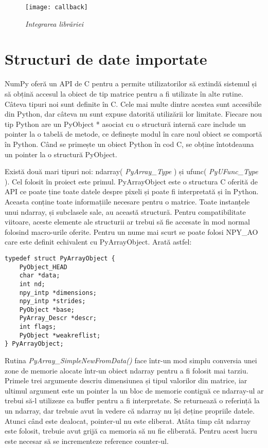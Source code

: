 \begin{figure}
    \centering
    \texttt{[image: callback]}
    \caption{\textit{Integrarea librăriei}}
    \label{cbs}
\end{figure}



\section{Structuri de date importate}

NumPy oferă un API de C pentru a permite utilizatorilor să extindă sistemul și să obțină accesul la obiect de tip matrice pentru a fi utilizate în alte rutine. 
Câteva tipuri noi sunt definite în C. Cele mai multe dintre acestea sunt accesibile din Python, dar câteva nu sunt expuse datorită utilizării lor limitate. Fiecare nou tip Python are un PyObject * asociat cu o structură internă care include un pointer la o tabelă de metode, ce definește modul în care noul obiect se comportă în Python. Când se primește un obiect Python în cod C, se obține întotdeauna un pointer la o structură PyObject.

Există două mari tipuri noi: ndarray( \textit{PyArray\_Type} ) și ufunc( \textit{PyUFunc\_Type} ). Cel folosit în proiect este primul. PyArrayObject este o structura C oferită de API ce poate ține toate datele despre pixeli și poate fi interpretată și în Python. Aceasta conține toate informațiile necesare pentru o matrice. Toate instanțele unui ndarray, și subclasele sale, au această structură. Pentru compatibilitate viitoare, aceste elemente ale structurii ar trebui să fie accesate în mod normal folosind macro-urile oferite. Pentru un nume mai scurt se poate folosi NPY\_AO care este definit echivalent cu PyArrayObject. Arată astfel:

\lstset{language=C,frame=single, showstringspaces=false}
\begin{lstlisting}
typedef struct PyArrayObject {
    PyObject_HEAD
    char *data;
    int nd;
    npy_intp *dimensions;
    npy_intp *strides;
    PyObject *base;
    PyArray_Descr *descr;
    int flags;
    PyObject *weakreflist;
} PyArrayObject;
\end{lstlisting}

Rutina \textit{PyArray\_SimpleNewFromData()} face într-un mod simplu conversia unei zone de memorie alocate într-un obiect ndarray pentru a fi folosit mai tarziu. Primele trei argumente descriu dimensiunea și tipul valorilor din matrice, iar ultimul argument este un pointer la un bloc de memorie contiguă ce ndarray-ul ar trebui să-l utilizeze ca buffer pentru a fi interpretate. Se returnează o referință la un ndarray, dar trebuie avut în vedere că ndarray nu își deține propriile datele. Atunci când este dealocat, pointer-ul nu este eliberat. Atâta timp cât ndarray este folosit, trebuie avut grijă ca memoria să nu fie eliberată. Pentru acest lucru este necesar să se incrementeze reference counter-ul.

